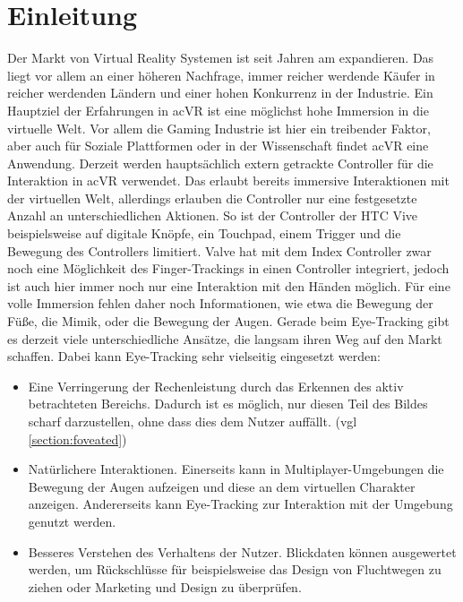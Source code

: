 \chapter{Einleitung}
Der Markt von Virtual Reality Systemen ist seit Jahren am expandieren. Das liegt vor allem an einer höheren Nachfrage, immer reicher werdende Käufer in reicher werdenden Ländern und einer hohen Konkurrenz in der Industrie\cite{grandview.2020}. Ein Hauptziel der Erfahrungen in ac{VR} ist eine möglichst hohe Immersion in die virtuelle Welt. Vor allem die Gaming Industrie ist hier ein treibender Faktor, aber auch für Soziale Plattformen oder in der Wissenschaft findet ac{VR} eine Anwendung. Derzeit werden hauptsächlich extern getrackte Controller für die Interaktion in ac{VR} verwendet. Das erlaubt bereits immersive Interaktionen mit der virtuellen Welt, allerdings erlauben die Controller nur eine festgesetzte Anzahl an unterschiedlichen Aktionen. So ist der Controller der HTC Vive beispielsweise auf digitale Knöpfe, ein Touchpad, einem Trigger und die Bewegung des Controllers limitiert. Valve hat mit dem Index Controller zwar noch eine Möglichkeit des Finger-Trackings in einen Controller integriert, jedoch ist auch hier immer noch nur eine Interaktion mit den Händen möglich. Für eine volle Immersion fehlen daher noch Informationen, wie etwa die Bewegung der Füße, die Mimik, oder die Bewegung der Augen. Gerade beim Eye-Tracking gibt es derzeit viele unterschiedliche Ansätze, die langsam ihren Weg auf den Markt schaffen. Dabei kann Eye-Tracking sehr vielseitig eingesetzt werden:
\begin{itemize}
	\item Eine Verringerung der Rechenleistung durch das Erkennen des aktiv betrachteten Bereichs. Dadurch ist es möglich, nur diesen Teil des Bildes scharf darzustellen, ohne dass dies dem Nutzer auffällt\cite{Rogers.2019}. (vgl \autoref{section:foveated})
	\item Natürlichere Interaktionen. Einerseits kann in Multiplayer-Umgebungen die Bewegung der Augen aufzeigen und diese an dem virtuellen Charakter anzeigen. Andererseits kann Eye-Tracking zur Interaktion mit der Umgebung genutzt werden\cite{Rogers.2019}. 
	\item Besseres Verstehen des Verhaltens der Nutzer. Blickdaten können ausgewertet werden, um Rückschlüsse für beispielsweise das Design von Fluchtwegen zu ziehen oder Marketing und Design zu überprüfen\cite{Rogers.2019}. 
\end{itemize}
